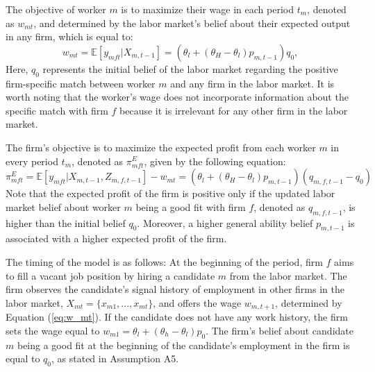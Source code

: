 \documentclass[12pt]{article}
\begin{document}

The objective of worker $m$ is to maximize their wage in each period $t_m$, denoted as $w_{mt}$, and determined by the labor market's belief about their expected output in any firm, which is equal to:
\begin{equation}\label{eq:w_mt}
w_{mt} = \mathbb{E}[y_{mft} | X_{m,t-1}] = \left( \theta_l + (\theta_H - \theta_l) p_{m,t-1}\right)q_0,
\end{equation}
Here, $q_0$ represents the initial belief of the labor market regarding the positive firm-specific match between worker $m$ and any firm in the labor market. It is worth noting that the worker's wage does not incorporate information about the specific match with firm $f$ because it is irrelevant for any other firm in the labor market.

The firm's objective is to maximize the expected profit from each worker $m$ in every period $t_m$, denoted as $\pi_{mft}^E$, given by the following equation:
\begin{equation}\label{eq:profit_NR}
    \pi^E_{mft} = \mathbb{E}[y_{mft} | X_{m,t-1}, Z_{m,f,t-1}] - w_{mt} = \left( \theta_l + (\theta_H - \theta_l) p_{m,t-1} \right)\left(q_{m,f,t-1} - q_0\right)
\end{equation}
Note that the expected profit of the firm is positive only if the updated labor market belief about worker $m$ being a good fit with firm $f$, denoted as $q_{m,f,t-1}$, is higher than the initial belief $q_0$. Moreover, a higher general ability belief $p_{m,t-1}$ is associated with a higher expected profit of the firm.

The timing of the model is as follows: At the beginning of the period, firm $f$ aims to fill a vacant job position by hiring a candidate $m$ from the labor market. The firm observes the candidate's signal history of employment in other firms in the labor market, $X_{mt} = \lbrace x_{m1}, ..., x_{mt} \rbrace$, and offers the wage $w_{m,t+1}$, determined by Equation (\ref{eq:w_mt}). If the candidate does not have any work history, the firm sets the wage equal to $w_{m1} = \theta_l + (\theta_h - \theta_l)p_0$. The firm's belief about candidate $m$ being a good fit at the beginning of the candidate's employment in the firm is equal to $q_0$, as stated in Assumption A5.
\end{document}
